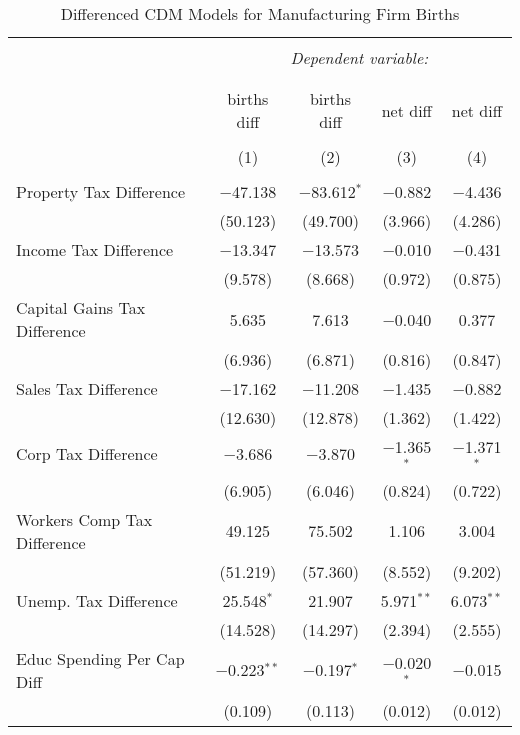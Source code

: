 
\begin{table}[!htbp] \centering 
  \caption{Differenced CDM Models for  Manufacturing Firm Births} 
  \label{} 
\begin{tabular}{@{\extracolsep{5pt}}lcccc} 
\\[-1.8ex]\hline 
\hline \\[-1.8ex] 
 & \multicolumn{4}{c}{\textit{Dependent variable:}} \\ 
\cline{2-5} 
\\[-1.8ex] & \multicolumn{4}{c}{ } \\ 
 & births diff & births diff & net diff & net diff \\ 
\\[-1.8ex] & (1) & (2) & (3) & (4)\\ 
\hline \\[-1.8ex] 
 Property Tax Difference & $-$47.138 & $-$83.612$^{*}$ & $-$0.882 & $-$4.436 \\ 
  & (50.123) & (49.700) & (3.966) & (4.286) \\ 
  Income Tax Difference & $-$13.347 & $-$13.573 & $-$0.010 & $-$0.431 \\ 
  & (9.578) & (8.668) & (0.972) & (0.875) \\ 
  Capital Gains Tax Difference & 5.635 & 7.613 & $-$0.040 & 0.377 \\ 
  & (6.936) & (6.871) & (0.816) & (0.847) \\ 
  Sales Tax Difference & $-$17.162 & $-$11.208 & $-$1.435 & $-$0.882 \\ 
  & (12.630) & (12.878) & (1.362) & (1.422) \\ 
  Corp Tax Difference & $-$3.686 & $-$3.870 & $-$1.365$^{*}$ & $-$1.371$^{*}$ \\ 
  & (6.905) & (6.046) & (0.824) & (0.722) \\ 
  Workers Comp Tax Difference & 49.125 & 75.502 & 1.106 & 3.004 \\ 
  & (51.219) & (57.360) & (8.552) & (9.202) \\ 
  Unemp. Tax Difference & 25.548$^{*}$ & 21.907 & 5.971$^{**}$ & 6.073$^{**}$ \\ 
  & (14.528) & (14.297) & (2.394) & (2.555) \\ 
  Educ Spending Per Cap Diff & $-$0.223$^{**}$ & $-$0.197$^{*}$ & $-$0.020$^{*}$ & $-$0.015 \\ 
  & (0.109) & (0.113) & (0.012) & (0.012) \\ 

\end{tabular}
\end{table}
